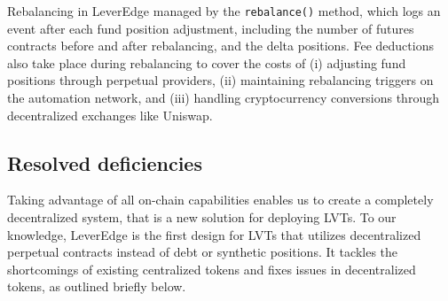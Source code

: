 Rebalancing in LeverEdge managed by the \texttt{rebalance()} method, which logs an event after each fund position adjustment, including the number of futures contracts before and after rebalancing, and the delta positions. Fee deductions also take place during rebalancing to cover the costs of (i) adjusting fund positions through perpetual providers, (ii) maintaining rebalancing triggers on the automation network, and (iii) handling cryptocurrency conversions through decentralized exchanges like Uniswap.



\subsection{Resolved deficiencies}\label{subsec:resolved}
Taking advantage of all on-chain capabilities enables us to create a completely decentralized system, that is a new solution for deploying LVTs. To our knowledge, LeverEdge is the first design for LVTs that utilizes decentralized perpetual contracts instead of debt or synthetic positions. It tackles the shortcomings of existing centralized tokens and fixes issues in decentralized tokens, as outlined briefly below.

